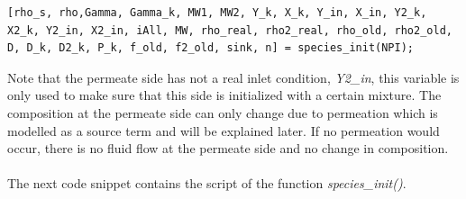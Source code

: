 \begin{lstlisting}[firstnumber={49}]
% species properties some values have to be set manually!!
[rho_s, rho,Gamma, Gamma_k, MW1, MW2, Y_k, X_k, Y_in, X_in, Y2_k, X2_k, Y2_in, X2_in, iAll, MW, rho_real, rho2_real, rho_old, rho2_old, D, D_k, D2_k, P_k, f_old, f2_old, sink, n] = species_init(NPI);
\end{lstlisting}

Note that the permeate side has not a real inlet condition, \textit{Y2\_in}, this variable is only used to make sure that this side is initialized with a certain mixture. The composition at the permeate side can only change due to permeation which is modelled as a source term and will be explained later. If no permeation would occur, there is no fluid flow at the permeate side and no change in composition. \\
\\
The next code snippet contains the script of the function \textit{species\_init()}.
\newpage
